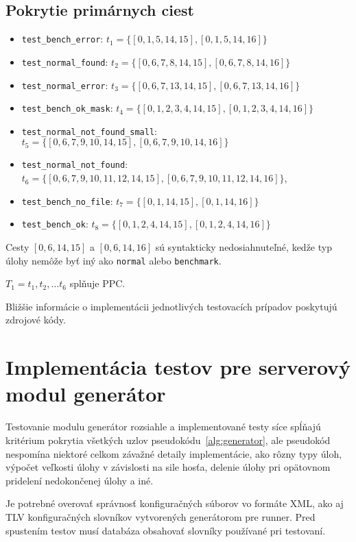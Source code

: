 \subsection*{Pokrytie primárnych ciest}
\begin{itemize}
	\item \texttt{test\_bench\_error}: $t_1 = \{[0, 1, 5, 14, 15], [0, 1, 5, 14, 16]\}$
	\item \texttt{test\_normal\_found}: $t_2 = \{[0, 6, 7, 8, 14, 15], [0, 6, 7, 8, 14, 16]\}$
	\item \texttt{test\_normal\_error}: $t_3 = \{[0, 6, 7, 13, 14, 15], [0, 6, 7, 13, 14, 16]\}$
	\item \texttt{test\_bench\_ok\_mask}: $t_4 = \{[0, 1, 2, 3, 4, 14, 15], [0, 1, 2, 3, 4, 14, 16]\}$
	\item \texttt{test\_normal\_not\_found\_small}: $t_5 = \{[0, 6, 7, 9, 10, 14, 15], [0, 6, 7, 9, 10, 14, 16]\}$
	\item \texttt{test\_normal\_not\_found}: $t_6 = \{[0, 6, 7, 9, 10, 11, 12, 14, 15], [0, 6, 7, 9, 10, 11, 12, 14, 16]\}$,
	\item \texttt{test\_bench\_no\_file}: $t_7 = \{[0, 1, 14, 15], [0, 1, 14, 16]\}$
	\item \texttt{test\_bench\_ok}: $t_8 = \{[0, 1, 2, 4, 14, 15], [0, 1, 2, 4, 14, 16]\}$
\end{itemize}
Cesty $[0, 6, 14, 15]$ a $[0, 6, 14, 16]$ sú syntakticky nedosiahnuteľné, kedže typ úlohy nemôže byť iný ako \texttt{normal} alebo \texttt{benchmark}.
\begin{center}
$T_1 = {t_1, t_2, \ldots t_6}$ splňuje PPC. 
\end{center}

\bigskip
\noindent
Bližšie informácie o implementácii jednotlivých testovacích prípadov poskytujú zdrojové kódy.


\section{Implementácia testov pre serverový modul generátor}
\label{impl_gen}
Testovanie modulu generátor rozsiahle a implementované testy síce spĺňajú kritérium pokrytia všetkých uzlov pseudokódu~\ref{alg:generator}, ale pseudokód nespomína niektoré celkom závažné detaily implementácie, ako rôzny typy úloh, výpočet veľkosti úlohy v závislosti na sile hosťa, delenie úlohy pri opätovnom pridelení nedokončenej úlohy a iné.

Je potrebné overovať správnosť konfiguračných súborov vo formáte XML, ako aj TLV konfiguračných slovníkov vytvorených generátorom pre runner. Pred spustením testov musí databáza obsahovať slovníky používané pri testovaní.

